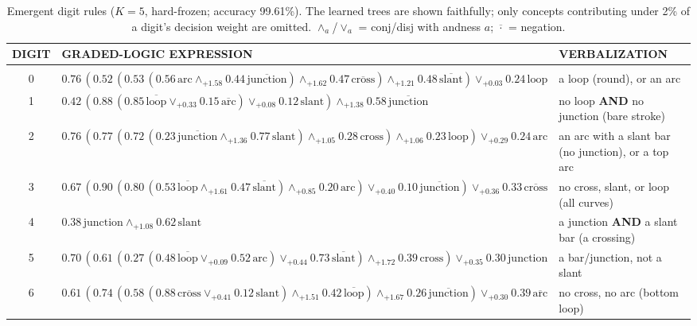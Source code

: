 \begin{table}[t]
\caption{Emergent digit rules ($K{=}5$, hard-frozen; accuracy 99.61\%). The learned trees are shown faithfully; only concepts contributing under 2\% of a digit's decision weight are omitted. $\wedge_a$/$\vee_a$ = conj/disj with andness $a$; $\overline{\cdot}$ = negation.}
\label{tab:digit-rules}
\begin{center}\footnotesize
\begin{tabular}{c l l}
{\bf DIGIT} & {\bf GRADED-LOGIC EXPRESSION} & {\bf VERBALIZATION} \\ \hline \\
0 & $0.76\,(0.52\,(0.53\,(0.56\,\text{arc}\mathbin{\wedge}_{+1.58}0.44\,\overline{\text{junction}})\mathbin{\wedge}_{+1.62}0.47\,\overline{\text{cross}})\mathbin{\wedge}_{+1.21}0.48\,\overline{\text{slant}})\mathbin{\vee}_{+0.03}0.24\,\text{loop}$ & a loop (round), or an arc \\[3pt]
1 & $0.42\,(0.88\,(0.85\,\overline{\text{loop}}\mathbin{\vee}_{+0.33}0.15\,\overline{\text{arc}})\mathbin{\vee}_{+0.08}0.12\,\text{slant})\mathbin{\wedge}_{+1.38}0.58\,\overline{\text{junction}}$ & no loop \textbf{AND} no junction (bare stroke) \\[3pt]
2 & $0.76\,(0.77\,(0.72\,(0.23\,\overline{\text{junction}}\mathbin{\wedge}_{+1.36}0.77\,\text{slant})\mathbin{\wedge}_{+1.05}0.28\,\text{cross})\mathbin{\wedge}_{+1.06}0.23\,\text{loop})\mathbin{\vee}_{+0.29}0.24\,\text{arc}$ & an arc with a slant bar (no junction), or a top arc \\[3pt]
3 & $0.67\,(0.90\,(0.80\,(0.53\,\overline{\text{loop}}\mathbin{\wedge}_{+1.61}0.47\,\overline{\text{slant}})\mathbin{\wedge}_{+0.85}0.20\,\text{arc})\mathbin{\vee}_{+0.40}0.10\,\overline{\text{junction}})\mathbin{\vee}_{+0.36}0.33\,\overline{\text{cross}}$ & no cross, slant, or loop (all curves) \\[3pt]
4 & $0.38\,\text{junction}\mathbin{\wedge}_{+1.08}0.62\,\text{slant}$ & a junction \textbf{AND} a slant bar (a crossing) \\[3pt]
5 & $0.70\,(0.61\,(0.27\,(0.48\,\overline{\text{loop}}\mathbin{\vee}_{+0.09}0.52\,\text{arc})\mathbin{\vee}_{+0.44}0.73\,\overline{\text{slant}})\mathbin{\wedge}_{+1.72}0.39\,\text{cross})\mathbin{\vee}_{+0.35}0.30\,\text{junction}$ & a bar/junction, not a slant \\[3pt]
6 & $0.61\,(0.74\,(0.58\,(0.88\,\overline{\text{cross}}\mathbin{\vee}_{+0.41}0.12\,\text{slant})\mathbin{\wedge}_{+1.51}0.42\,\overline{\text{loop}})\mathbin{\wedge}_{+1.67}0.26\,\overline{\text{junction}})\mathbin{\vee}_{+0.30}0.39\,\overline{\text{arc}}$ & no cross, no arc (bottom loop) \\[3pt]

\end{tabular}
\end{center}
\end{table}
